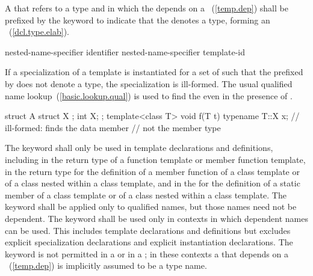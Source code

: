 \pnum
A  that refers to a type and in which the
 depends on a
~(\ref{temp.dep}) shall be prefixed by
the keyword  to indicate that the
 denotes a type, forming an
~(\ref{dcl.type.elab}).

\begin{ncbnf}
\br
  \br
   \terminal{::}\opt nested-name-specifier identifier\br
   \terminal{::}\opt nested-name-specifier  template-id\br
\end{ncbnf}

\pnum
If a specialization of a template is instantiated for a set of
such that the
prefixed by
does not denote a type, the specialization is ill-formed.
The usual qualified name lookup~(\ref{basic.lookup.qual}) is used to find the
even in the presence of
.
\enterexample

\begin{codeblock}
struct A {
	struct X { };
	int X;
};
template<class T> void f(T t) {
	typename T::X x;	// ill-formed: finds the data member 
				// not the member type 
}
\end{codeblock}
\exitexampleb

\pnum
The keyword  shall only be used in template declarations
and definitions, including in the return type of a function template or
member function template, in the return type for the definition of a member
function of a class template or of a class nested within a class template,
and in the  for the definition of a static
member of a class template or of a class nested within a class template.
The keyword  shall be applied only to qualified names, but
those names need not be dependent. The keyword  shall be
used only in contexts in which dependent names can be used. This includes
template declarations and definitions but excludes explicit specialization
declarations and explicit instantiation declarations. The keyword
 is not permitted in a  or in a
; in these contexts a 
that depends on a ~(\ref{temp.dep}) is
implicitly assumed to be a type name.

